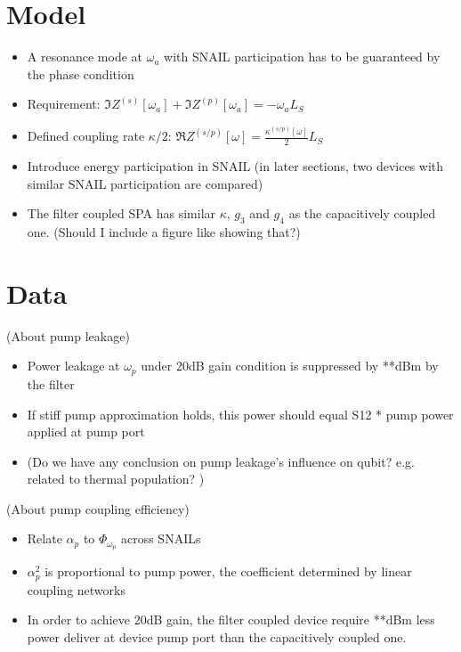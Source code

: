 \documentclass[aip,reprint]{revtex4-2}
\begin{document}
\section{Model}

\begin{itemize}
	\item A resonance mode at $\omega_a$ with SNAIL participation has to be guaranteed by the phase condition
	\item Requirement: $\Im{Z^{(s)}[\omega_a]} + \Im{Z^{(p)}[\omega_a]} =  - \omega_a L_S$
	\item Defined coupling rate $\kappa/2$: 
	$\Re{Z^{(s/p)}[\omega]} =  \frac{\kappa^{(s/p)}[\omega]}{2} L_S$
	\item Introduce energy participation in SNAIL (in later sections, two devices with similar SNAIL participation are compared)
	\item The filter coupled SPA has similar $\kappa$, $g_3$ and $g_4$ as the capacitively coupled one. (Should I include a figure like  showing that?)
\end{itemize}

\section{Data}

(About pump leakage)

\begin{itemize}
	\item Power leakage at $\omega_p$ under 20dB gain condition is suppressed by **dBm by the filter 
	\item If stiff pump approximation holds, this power should equal S12 * pump power applied at pump port
	\item (Do we have any conclusion on pump leakage's influence on qubit? e.g. related to thermal population? )
\end{itemize}

(About pump coupling efficiency)

\begin{itemize}
	\item Relate $\alpha_p$ to $\Phi_{\omega_p}$ across SNAILs
	\item $\alpha_p^2$ is proportional to pump power, the coefficient determined by linear coupling networks
	\item In order to achieve 20dB gain, the filter coupled device require **dBm less power deliver at device pump port than the capacitively coupled one. 
\end{itemize}
\end{document}
